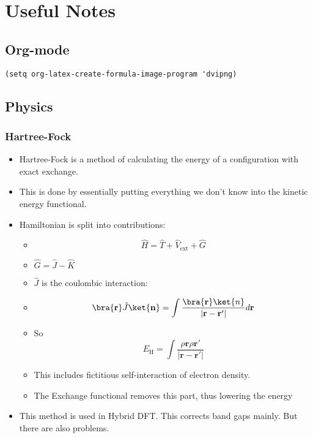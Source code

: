 \documentclass[11pt]{article}
\begin{document}
\section{Useful Notes}
\label{sec-4}
\subsection{Org-mode}
\label{sec-4-1}
\begin{verbatim}
(setq org-latex-create-formula-image-program 'dvipng)
\end{verbatim}

\subsection{Physics}
\label{sec-4-2}
\subsubsection{Hartree-Fock}
\label{sec-4-2-1}
\begin{itemize}
\item Hartree-Fock is a method of calculating the energy of a configuration
with exact exchange.
\item This is done by essentially putting everything we don't know into the
kinetic energy functional.
\item Hamiltonian is split into contributions:
\begin{itemize}
\item \[\hat{H} = \hat{T} + \hat{V}_{ \text{ext} } + \hat{G}\]
\item $\hat{G} = \hat{J} - \hat{K}$
\item $\hat{J}$ is the coulombic interaction:
\item \[ \bra{ \mathbf{r} } \hat{J} \ket{ \mathbf{n} } = \int \frac{ \bra{\mathbf{r}}\ket{n} }{|\mathbf{r} - \mathbf{r'}  |}d\mathbf{r} \]
\item So \[ E_{\text{H}} = \int \frac{\rho{\mathbf{r}\rho{\mathbf{r}'}}}{|\mathbf{r} - \mathbf{r'}|}\]
\item This includes fictitious self-interaction of electron density.
\item The Exchange functional removes this part, thus lowering the energy
\end{itemize}

\item This method is used in Hybrid DFT. This corrects band gaps mainly. But
there are also problems.
\end{itemize}
\end{document}

